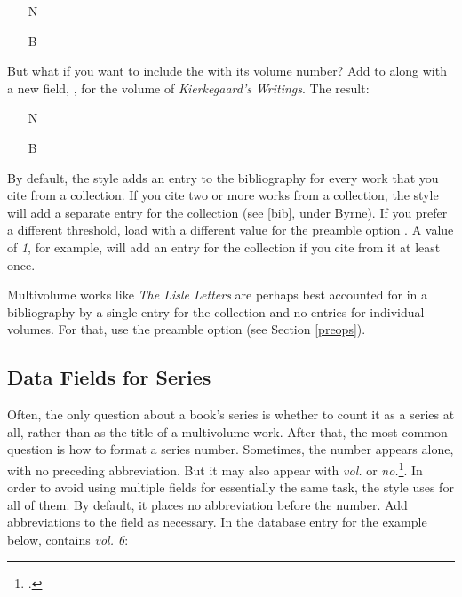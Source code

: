 \documentclass[11pt,letterpaper,oneside]{article}
\begin{document}
\begin{itemize}
\item[N] 

\item[B] 
\end{itemize}

But what if you want to include the  with its
volume number? Add  to  along
with a new field, , for the volume of
\textit{Kierkegaard's Writings}. The result:

\begin{itemize}
\item[N] 

\item[B] 
\end{itemize}

By default, the style adds an entry to the bibliography for every work
that you cite from a collection. If you cite two or more works from a
collection, the style will add a separate entry for the collection
(see \ref{bib}, under Byrne). If you prefer a different threshold,
load \biblatex with a different value for the preamble option
. A value of \textit{1}, for example, will add an
entry for the collection if you cite from it at least once.

Multivolume works like \textit{The Lisle Letters} are perhaps best
accounted for in a bibliography by a single entry for the collection
and no entries for individual volumes. For that, use the preamble
option  (see Section \ref{preops}).

\subsection{Data Fields for Series}

Often, the only question about a book's series is whether to count it
as a series at all, rather than as the title of a multivolume work.
After that, the most common question is how to format a series number.
Sometimes, the number appears alone, with no preceding abbreviation.
But it may also appear with \textit{vol.} or
\textit{no.}\footcite[\ref{14.128}. See also \ref{14.130} and
\ref{14.132}.]{chicago2010}. In order to avoid using multiple fields
for essentially the same task, the style uses  for
all of them. By default, it places no abbreviation before the number.
Add abbreviations to the field as necessary. In the database entry for
the example below,  contains \textit{vol. 6}:
\end{document}
